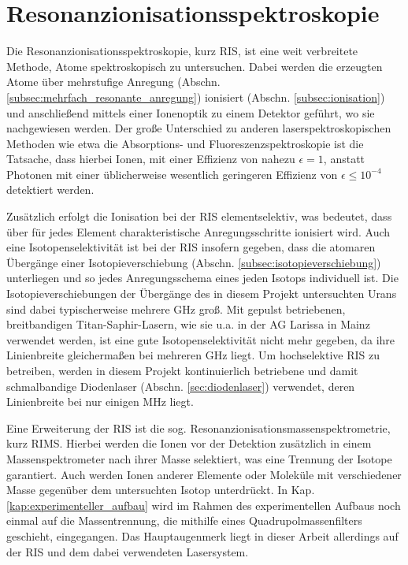 \section{Resonanzionisationsspektroskopie}\label{sec:ris}
Die Resonanzionisationsspektroskopie, kurz RIS, ist eine weit verbreitete
Methode, Atome spektroskopisch zu untersuchen. Dabei werden die erzeugten Atome
über mehrstufige Anregung (Abschn. \ref{subsec:mehrfach_resonante_anregung})
ionisiert (Abschn. \ref{subsec:ionisation}) und anschließend mittels
einer Ionenoptik zu einem Detektor geführt, wo sie nachgewiesen werden. Der
große Unterschied zu anderen laserspektroskopischen Methoden wie
etwa die Absorptions- und Fluoreszenzspektroskopie ist die Tatsache, dass
hierbei Ionen, mit einer Effizienz von nahezu $\epsilon=1$, anstatt Photonen mit
einer üblicherweise wesentlich geringeren Effizienz von $\epsilon\leq10^{-4}$
detektiert werden.\par
Zusätzlich erfolgt die Ionisation bei der RIS elementselektiv, was
bedeutet, dass über für jedes Element charakteristische Anregungsschritte
ionisiert wird.
Auch eine Isotopenselektivität ist bei der RIS insofern gegeben, dass die
atomaren Übergänge einer Isotopieverschiebung (Abschn. \ref{subsec:isotopieverschiebung})
unterliegen und so jedes Anregungsschema eines jeden Isotops individuell
ist. Die Isotopieverschiebungen der Übergänge des in diesem Projekt
untersuchten Urans sind dabei typischerweise mehrere
GHz groß. Mit gepulst betriebenen, breitbandigen
Titan-Saphir-Lasern, wie sie u.a. in der AG Larissa in Mainz verwendet werden,
ist eine gute Isotopenselektivität nicht mehr gegeben, da ihre Linienbreite
gleichermaßen bei mehreren GHz liegt. Um hochselektive RIS zu betreiben,
werden in diesem Projekt kontinuierlich betriebene und damit schmalbandige
Diodenlaser (Abschn. \ref{sec:diodenlaser}) verwendet, deren Linienbreite bei nur einigen
MHz liegt.\par
Eine Erweiterung der RIS ist die sog. Resonanzionisationsmassenspektrometrie,
kurz RIMS. Hierbei werden die Ionen vor der Detektion zusätzlich in einem
Massenspektrometer nach ihrer Masse selektiert, was eine Trennung der Isotope
garantiert. Auch werden Ionen anderer Elemente oder Moleküle mit verschiedener
Masse gegenüber dem untersuchten Isotop unterdrückt. In Kap.
\ref{kap:experimenteller_aufbau} wird im Rahmen des experimentellen Aufbaus noch
einmal auf die Massentrennung, die mithilfe eines Quadrupolmassenfilters
geschieht, eingegangen. Das Hauptaugenmerk liegt in dieser Arbeit allerdings auf der RIS
und dem dabei verwendeten Lasersystem.

